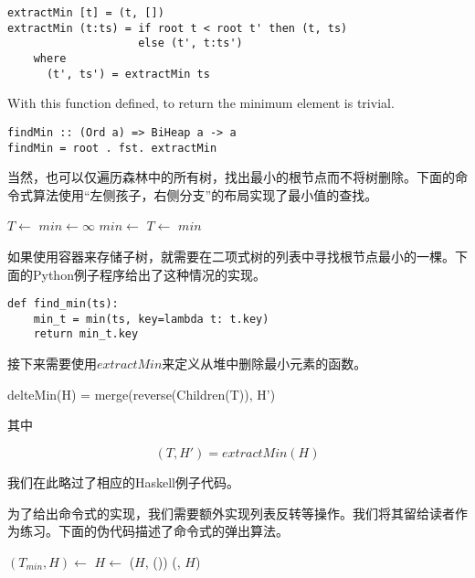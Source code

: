 \documentclass[UTF8]{article}
\begin{document}
\lstset{language=Haskell}
\begin{lstlisting}
extractMin [t] = (t, [])
extractMin (t:ts) = if root t < root t' then (t, ts)
                    else (t', t:ts')
    where
      (t', ts') = extractMin ts
\end{lstlisting}

With this function defined, to return the minimum element is trivial.

\begin{lstlisting}
findMin :: (Ord a) => BiHeap a -> a
findMin = root . fst. extractMin
\end{lstlisting}

当然，也可以仅遍历森林中的所有树，找出最小的根节点而不将树删除。下面的命令式算法使用“左侧孩子，右侧分支”的布局实现了最小值的查找。

\begin{algorithmic}[1]
  \State $T \gets $ 
  \State $min \gets \infty$
      \State $min \gets $ 
    \EndIf
    \State $T \gets $ 
  \EndWhile
  \State \Return $min$
\EndFunction
\end{algorithmic}

如果使用容器来存储子树，就需要在二项式树的列表中寻找根节点最小的一棵。下面的Python例子程序给出了这种情况的实现。

\lstset{language=Python}
\begin{lstlisting}
def find_min(ts):
    min_t = min(ts, key=lambda t: t.key)
    return min_t.key
\end{lstlisting}

接下来需要使用$extractMin$来定义从堆中删除最小元素的函数。

\be
delteMin(H) = merge(reverse(Children(T)), H')
\ee

其中

\[
  (T, H') = extractMin(H)
\]

我们在此略过了相应的Haskell例子代码。

为了给出命令式的实现，我们需要额外实现列表反转等操作。我们将其留给读者作为练习。下面的伪代码描述了命令式的弹出算法。

\begin{algorithmic}[1]
  \State $(T_{min}, H) \gets$ 
  \State $H \gets$ ($H$, ())
  \State \Return (, $H$)
\EndFunction
\end{algorithmic}
\end{document}
